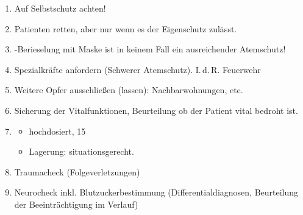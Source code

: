 \label{m:am-stickgase}
\begin{enumerate}
  \item Auf Selbstschutz achten!
  \item Patienten retten, aber nur wenn es der
  Eigenschutz zulässt.
  \item {}-Berieselung mit Maske ist in keinem Fall
  ein ausreichender Atemschutz!
  
  \item Spezialkräfte anfordern (Schwerer Atemschutz).
  I.\,d.\,R. Feuerwehr
  \item Weitere Opfer ausschließen (lassen):
  Nachbarwohnungen, etc.
  \item Sicherung der Vitalfunktionen, Beurteilung ob der
  Patient vital bedroht ist.
  \item \TxBeiVit \TxMassVitMKBes
  \begin{itemize}
    \item {} hochdosiert, 15\LPerMin*
    \item Lagerung: situationsgerecht.
  \end{itemize}
  \item Traumacheck (Folgeverletzungen)
  \item Neurocheck inkl. Blutzuckerbestimmung
  (Differentialdiagnosen, Beurteilung der Beeinträchtigung im Verlauf)
\end{enumerate}